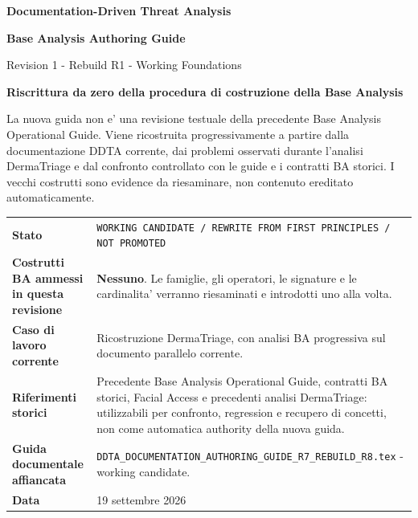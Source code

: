 \documentclass[11pt,a4paper]{article}
\begin{document}

\begin{titlepage}
\thispagestyle{empty}
\vspace*{8mm}

{\sffamily\bfseries\color{DDTANavy}\fontsize{15}{18}\selectfont Documentation-Driven Threat Analysis}\par
\vspace{5mm}
{\sffamily\bfseries\color{DDTANavy}\fontsize{29}{33}\selectfont Base Analysis Authoring Guide}\par
\vspace{2mm}
{\sffamily\color{DDTABlue}\fontsize{18}{22}\selectfont Revision 1 - Rebuild R1 - Working Foundations}\par

\vspace{10mm}
\begin{tcolorbox}[enhanced,arc=3pt,boxrule=0pt,colback=DDTANavy,left=12pt,right=12pt,top=11pt,bottom=11pt]
{\color{white}\sffamily\bfseries\large Riscrittura da zero della procedura di costruzione della Base Analysis}\par
\vspace{2mm}
{\color{white!88}\small La nuova guida non e' una revisione testuale della precedente Base Analysis Operational Guide. Viene ricostruita progressivamente a partire dalla documentazione DDTA corrente, dai problemi osservati durante l'analisi DermaTriage e dal confronto controllato con le guide e i contratti BA storici. I vecchi costrutti sono evidence da riesaminare, non contenuto ereditato automaticamente.}
\end{tcolorbox}

\vspace{8mm}
\begin{tabularx}{\textwidth}{L{48mm}Y}
\toprule
\textbf{Stato} & \texttt{WORKING CANDIDATE / REWRITE FROM FIRST PRINCIPLES / NOT PROMOTED} \\
\textbf{Costrutti BA ammessi in questa revisione} & \textbf{Nessuno}. Le famiglie, gli operatori, le signature e le cardinalita' verranno riesaminati e introdotti uno alla volta. \\
\textbf{Caso di lavoro corrente} & Ricostruzione DermaTriage, con analisi BA progressiva sul documento parallelo corrente. \\
\textbf{Riferimenti storici} & Precedente Base Analysis Operational Guide, contratti BA storici, Facial Access e precedenti analisi DermaTriage: utilizzabili per confronto, regression e recupero di concetti, non come automatica authority della nuova guida. \\
\textbf{Guida documentale affiancata} & \nolinkurl{DDTA_DOCUMENTATION_AUTHORING_GUIDE_R7_REBUILD_R8.tex} - working candidate. \\
\textbf{Data} & 19 settembre 2026 \\
\bottomrule
\end{tabularx}


\end{titlepage}
\end{document}
